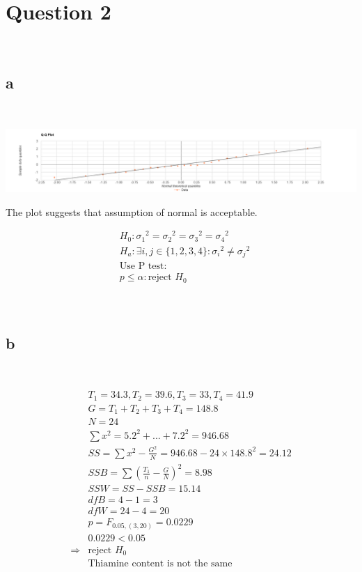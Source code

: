 \documentclass{article}
\begin{document}
\newpage

\section*{Question 2}

~

\subsection*{a}

~

\includegraphics[scale=0.18]{2a.png}

The plot suggests that assumption of normal is acceptable.

\begin{align*}
    &H_0:{\sigma_1}^2={\sigma_2}^2={\sigma_3}^2={\sigma_4}^2\\
    &H_a:\exists i,j\in\{1,2,3,4\}:{\sigma_i}^2\ne{\sigma_j}^2\\
    &\text{Use P test}:\\
    &p\leqslant \alpha:\text{reject }H_0\\
\end{align*}

~

\subsection*{b}

~

\begin{align*}
    &T_1=34.3,T_2=39.6,T_3=33,T_4=41.9\\
    &G=T_1+T_2+T_3+T_4=148.8\\
    &N=24\\
    &\sum x^2=5.2^2+...+7.2^2=946.68\\
    &SS=\sum x^2-\frac{G^2}{N}=946.68-24\times148.8^2=24.12\\
    &SSB=\sum (\frac{T_1}{n}-\frac{G}{N})^2=8.98\\
    &SSW=SS-SSB=15.14\\
    &dfB=4-1=3\\
    &dfW=24-4=20\\
    &p=F_{0.05,(3,20)}=0.0229\\
    &0.0229<0.05\\
    \Rightarrow&\text{reject }H_0\\
    &\text{Thiamine content is not the same}\\
\end{align*}
\end{document}
